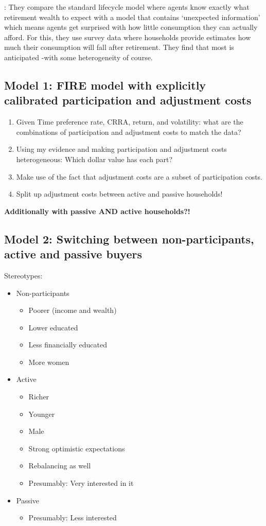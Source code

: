 \documentclass[ProjectABM]{subfiles}
\begin{document}
\cite{ACL2007_retirement}: They compare the standard lifecycle model where agents know exactly what retirement wealth to expect with a model that contains ‘unexpected information’ which means agents get surprised with how little consumption they can actually afford. For this, they use survey data where households provide estimates how much their consumption will fall after retirement. They find that most is anticipated -with some heterogeneity of course. 

\subsection{Model 1: FIRE model with explicitly calibrated participation and adjustment costs}
\begin{enumerate}
	\item Given Time preference rate, CRRA, return, and volatility: what are the combinations of participation and adjustment costs to match the data?
	\item Using my evidence and making participation and adjustment costs heterogeneous: Which dollar value has each part?
	\item Make use of the fact that adjustment costs are a subset of participation costs.
	\item Split up adjustment costs between active and passive households!
\end{enumerate}

\textbf{Additionally with passive AND active households?!}

\subsection{Model 2: Switching between non-participants, active and passive buyers}
Stereotypes:
\begin{itemize}
	\item Non-participants
	\begin{itemize}
		\item Poorer (income and wealth)
		\item Lower educated
		\item Less financially educated
		\item More women
	\end{itemize}
	\item Active
	\begin{itemize}
		\item Richer
		\item Younger
		\item Male
		\item Strong optimistic expectations
		\item Rebalancing as well
		\item Presumably: Very interested in it
	\end{itemize}
	\item Passive
	\begin{itemize}
		\item Presumably: Less interested
	\end{itemize}
\end{itemize}
\end{document}
